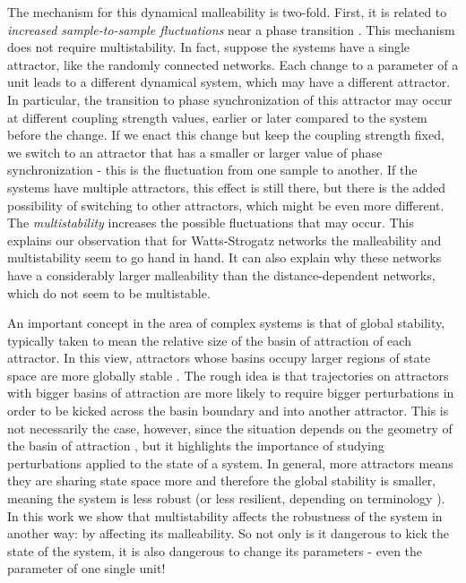 The mechanism for this dynamical malleability is two-fold. First, it is related to \textit{increased sample-to-sample fluctuations} near a phase transition \cite{hong2007entrainment, hong2007finitesizescalingpre}. This mechanism does not require multistability. In fact, suppose the systems have a single attractor, like the randomly connected networks. Each change to a parameter of a unit leads to a different dynamical system, which may have a different attractor. In particular, the transition to phase synchronization of this attractor may occur at different coupling strength values, earlier or later compared to the system before the change. If we enact this change but keep the coupling strength fixed, we switch to an attractor that has a smaller or larger value of phase synchronization - this is the fluctuation from one sample to another. If the systems have multiple attractors, this effect is still there, but there is the added possibility of switching to other attractors, which might be even more different. The \textit{multistability} increases the possible fluctuations that may occur. This explains our observation that for Watts-Strogatz networks the malleability and multistability seem to go hand in hand. It can also explain why these networks have a considerably larger malleability than the distance-dependent networks, which do not seem to be multistable.

An important concept in the area of complex systems is that of global stability, typically taken to mean the relative size of the basin of attraction of each attractor. In this view, attractors whose basins occupy larger regions of state space are more globally stable \cite{menck2013how}. The rough idea is that trajectories on attractors with bigger basins of attraction are more likely to require bigger perturbations in order to be kicked across the basin boundary and into another attractor. This is not necessarily the case, however, since the situation depends on the geometry of the basin of attraction \cite{krakovska2023resilience}, but it highlights the importance of studying perturbations applied to the state of a system. In general, more attractors means they are sharing state space more and therefore the global stability is smaller, meaning the system is less robust (or less resilient, depending on terminology \cite{krakovska2023resilience}). In this work we show that multistability affects the robustness of the system in another way: by affecting its malleability. So not only is it dangerous to kick the state of the system, it is also dangerous to change its parameters - even the parameter of one single unit!

